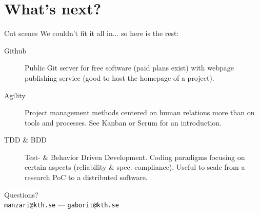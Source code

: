 \documentclass[10pt]{beamer}
\begin{document}
\section{What's next?} %

\begin{frame}{Cut scenes}
		We couldn't fit it all in... so here is the rest:

		\begin{description}
			\item[Github] Public Git server for free software (paid plans exist)
				with webpage publishing service (good to host the homepage of a project).
			\item[Agility] Project management methods centered on human relations more than on
				tools and processes. See Kanban or Scrum for an introduction.
			\item[TDD \& BDD] Test- \& Behavior Driven Development. Coding paradigms focusing
				on certain aspects (reliability \& spec. compliance). Useful to scale from a
				research PoC to a distributed software.
		\end{description}
\end{frame}


\begin{frame}[standout] %
	\vspace{0.05\textwidth}
	\colorbox{white}{\textcolor{KTHBlue}{Questions?}}\\
	\vspace{0.25\textwidth}
	\scriptsize{\texttt{manzari@kth.se}} --- \scriptsize{\texttt{gaborit@kth.se}}\\
\end{frame}

\end{document}

